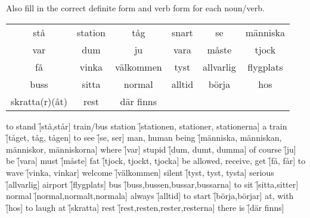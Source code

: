 \begin{flushleft}
    Also fill in the correct definite form and verb form for each noun/verb.
\end{flushleft}
\begin{center}
    \begin{tabular}{|c c c c c c|}
        \hline
        stå & station & tåg & snart & se & människa \\
        var & dum & ju & vara & måste & tjock \\
        få & vinka & välkommen & tyst & allvarlig & flygplats \\
        buss & sitta & normal & alltid & börja & hos \\
        skratta(r)(åt) & rest & där finns &&& \\
        \hline
    \end{tabular}
\end{center}

\begin{questions}
    \begin{multicols}{2}
        \raggedcolumns
        \question to stand \f[stå,står]
        \question train/bus station \f[stationen, stationer, stationerna]
        \question a train \f[tåget, tåg, tågen]
        \question to see \f[se, ser]
        \question man, human being \f[människa, människan, människor, människorna]
        \question where \f[var]
        \question stupid \f[dum, dumt, dumma]
        \question of course \f[ju]
        \question be \f[vara]
        \question must \f[måste]
        \question fat \f[tjock, tjockt, tjocka]
        \question be allowed, receive, get \f[få, får]
        \question to wave \f[vinka, vinkar]
        \question welcome \f[välkommen]
        \question silent \f[tyst, tyst, tysta]
        \question serious \f[allvarlig]
        \question airport \f[flygplats]
        \question bus \f[buss,bussen,bussar,bussarna]
        \question to sit \f[sitta,sitter]
        \question normal \f[normal,normalt,normala]
        \question always \f[alltid]
        \question to start \f[börja,börjar]
        \question at, with \f[hos]
        \question to laugh at \f[skratta]
        \question rest \f[rest,resten,rester,resterna]
        \question there is \f[där finns]
    \end{multicols}
\end{questions}
